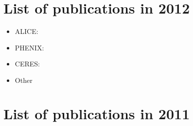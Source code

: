 \documentclass[12pt]{article}
\begin{document}
\section{List of publications in 2012}

\begin{itemize}
\item ALICE:
\cite{
Abelev:2012ej,
ALICE:2011ac,
ALICE:2011aa,
Abelev:2011md,
Aamodt:2011vg,
Abelev:2012hy,
Abelev:2012wca,
Abelev:2012tca,
Abelev:2012ms,
Abelev:2012qh,
Abelev:2012gx,
Abelev:2012cn,
Abelev:2012xe,
Abelev:2012vra,
Abelev:2012sk,
Abelev:2012jp,
Abelev:2012kr,
ALICE:2012aa,
ALICE:2012ab,
Abelev:2012rz,
Abelev:2012rv,
Abelev:2012pi,
ALICE:2011ad,
Aamodt:2011by}
%

\item PHENIX:
\cite{
Adare:2012wf,
Afanasiev:2012dg,
Adare:2012yt,
Adare:2012uk,
Adare:2012px,
Adare:2012vq,
Adare:2012nq,
Adare:2011zr,
Adare:2011vq}


\item CERES:
\cite{Adamova:2012md}

\item Other
\cite{Kral:2012ae}

\end{itemize}

\section{List of publications in 2011}
\end{document}
